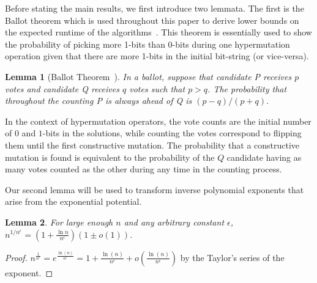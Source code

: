 \documentclass[lettersize,journal]{IEEEtran}
\newtheorem{lemma}{Lemma}
\begin{document}
Before stating the main results, we first introduce two lemmata. The first is the Ballot theorem which is used throughout this paper to derive lower bounds on the expected runtime of the algorithms~\cite{feller1968,JansenZarges2011,CorusOlivetoYazdani2019TCS}.  This theorem is essentially used to show the probability of picking more 1-bits than 0-bits during one hypermutation operation given that there are more 1-bits in the initial bit-string (or vice-versa). 
\begin{lemma} [Ballot Theorem~\cite{feller1968}] \label{lem:ballot} 
In a ballot, suppose that candidate P receives $p$ votes and candidate Q receives $q$ votes such that $p>q$. The probability that throughout the counting P is always ahead of Q is $(p-q)/(p+q)$. 
\end{lemma}

{\color{black}In the context of hypermutation operators, the vote counts are the initial number of $0$ and $1$-bits in the solutions, while counting the votes correspond to flipping them until the first constructive mutation. The probability that a constructive mutation is found is equivalent to the probability of the $Q$ candidate having as many votes counted as the other during any time in the counting process.}

Our second lemma will be used to transform inverse polynomial exponents that arise from the exponential potential.
\begin{lemma}\label{lem:expo}
	For large enough $n$ and {\color{black}any arbitrary constant} $\epsilon$, 
	$n^{1/n^{\epsilon}}= (1+\frac{\ln{n}}{n^{\epsilon}})(1 \pm o(1))$.
\end{lemma}
\begin{proof}
	$n^{\frac{1}{n^\epsilon}} = e^{\frac{\ln(n)}{n^\epsilon}} = 1 + \frac{\ln(n)}{n^\epsilon} + o(\frac{\ln(n)}{n^\epsilon})$ by the Taylor's series of the exponent.
\end{proof}
\end{document}
